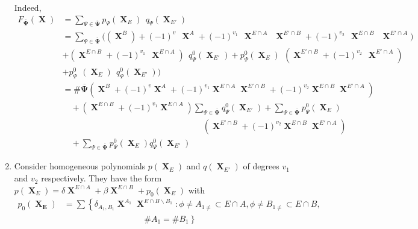 \documentclass[a4paper,12pt]{article}
\DeclareMathOperator{\x}{\mathrm{X}}
\theoremstyle{definition}
\theoremstyle{underlinethm}
\theoremstyle{definition}
\begin{document}
\begin{enumerate}[label=(\alph*)]
Indeed,
\begin{align*}
F_{\overline{\boldsymbol{\Psi}}}(\boldsymbol{\x}) &= \sum_{\Psi \in \overline{\boldsymbol{\Psi}}} p_{\Psi} (\boldsymbol{\x}_{E})~~ q_{\Psi} (\boldsymbol{\x}_{E'})\\
&= \sum_{\Psi \in \overline{\boldsymbol{\Psi}}} \Bigg((\boldsymbol{\x}^{B}) + (-1)^{v}~~\boldsymbol{\x}^{A} + (-1)^{v_{1}}~~ \boldsymbol{\x}^{E \cap A} ~~\boldsymbol{\x}^{E'\cap B} + (-1)^{v_{2}}~~ \boldsymbol{\x}^{E \cap B}~~ \boldsymbol{\x}^{E' \cap A})\\ 
 &  + \left(\boldsymbol{\x}^{E \cap B} + (-1)^{v_{1}}~~ \boldsymbol{\x}^{E \cap A}\right)~~q_{\Psi}^{0} (\boldsymbol{\x}_{E'})  + p_{\Psi}^{0}(\boldsymbol{\x}_{E})~~ \left(\boldsymbol{\x}^{E' \cap B} + (-1)^{v_{2}}~~ \boldsymbol{\x}^{E' \cap A} \right)\\
 & + p_{\Psi}^{0}~~ (\boldsymbol{\x}_{E})~~ q_{\Psi}^{0}(\boldsymbol{\x}_{E'}) \Bigg)\\
 & = \# \overline{\boldsymbol{\Psi}} \left(\boldsymbol{\x}^{B} + (-1)^{v} \boldsymbol{\x}^{A} + (-1)^{v_{1}} \boldsymbol{\x}^{E \cap A} \boldsymbol{\x}^{E' \cap B} + (-1)^{v_{2}} \boldsymbol{\x}^{E \cap B} \boldsymbol{\x}^{E' \cap A} \right)\\
 &\quad + \left(\boldsymbol{\x}^{E \cap B} + (-1)^{v_{1}} \boldsymbol{\x}^{E \cap A}\right) \sum_{\Psi \in \overline{\boldsymbol{\Psi}}} q_{\Psi}^{0}(\boldsymbol{\x}_{E'}) + \sum_{\Psi \in \overline{\boldsymbol{\Psi}}} p_{\Psi}^{0}(\boldsymbol{\x}_{E}) \\
 &\hspace{7cm} \left(\boldsymbol{\x}^{E' \cap B} + (-1)^{v_{2}} \boldsymbol{\x}^{E \cap B} \boldsymbol{\x}^{E' \cap A} \right)\\
 & \quad + \sum_{\Psi \in \overline{\boldsymbol{\Psi}}} p_{\Psi}^{0} (\boldsymbol{\x}_{E}) q^{0}_{\Psi} (\boldsymbol{\x}_{E'})\tag{3.26}\label{eq-3.26}
\end{align*}

\item Consider homogeneous polynomials $p(\boldsymbol{\x}_{E})$ and $q(\boldsymbol{\x}_{E'})$ of degrees $v_{1}$ and $v_{2}$ respectively. They have the form
$p(\boldsymbol{\x}_{E}) = \delta \boldsymbol{\x}^{E \cap A} + \beta\boldsymbol{\x}^{E \cap B} + p_{0}(\boldsymbol{\x}_{E})$ with
\begin{align*}
p_{0}(\boldsymbol{\x_{E}}) &= \sum\left\{\delta_{A_{1}, B_{1}} \boldsymbol{\x}^{A_{1}} \boldsymbol{\x}^{E \cap B \smallsetminus B_{1}} : \phi \neq A_{1 \neq} \subset E \cap A, \phi \neq B_{1 \neq} \subset E \cap B,\right.\\
&\left.\hspace{4cm} \# A_{1}= \# B_{1}\right\}\tag{3.27}\label{eq-3.27} 
\end{align*}


\end{enumerate}
\end{document}
